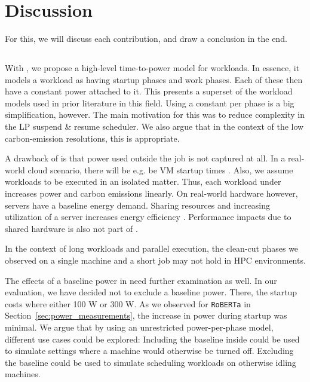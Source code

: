 \chapter{Discussion} \label{sec:discussion}

For this, we will discuss each contribution, and draw a conclusion in the end.

\section{\modelname{}}

With \modelname{}, we propose a high-level time-to-power model for workloads.
In essence, it models a workload as having startup phases and work phases. 
Each of these then have a constant power attached to it. 
This presents a superset of the workload models used in prior literature in this field.
Using a constant per phase is a big simplification, however. 
The main motivation for this was to reduce complexity in the LP suspend \& resume scheduler.
We also argue that in the context of the low carbon-emission resolutions, this is appropriate.

A drawback of \modelname{} is that power used outside the job is not captured at all.
In a real-world cloud scenario, there will be e.g. be VM startup times \cite{zheng_benchmarking_2019}.
Also, we assume workloads to be executed in an isolated matter. 
Thus, each workload under \modelname{} increases power and carbon emissions linearly.
On real-world hardware however, servers have a baseline energy demand. 
Sharing resources and increasing utilization of a server increases energy efficiency \cite{barroso_case_2007}. 
Performance impacts due to shared hardware is also not part of \modelname{}.

In the context of long workloads and parallel execution, the clean-cut phases we observed on a single machine and a short job may 
not hold in HPC environments.

The effects of a baseline power in \modelname{} need further examination as well.
In our evaluation, we have decided not to exclude a baseline power. There, the startup costs where either 100 W or 300 W. As we observed for \verb|RoBERTa| in Section~\ref{sec:power_measurements}, the increase in power during startup was minimal. 
We argue that by using an unrestricted power-per-phase model, different use cases could be explored:
Including the baseline inside \modelname{} could be used to simulate settings where a machine would otherwise be turned off. 
Excluding the baseline could be used to simulate scheduling workloads on otherwise idling machines.


